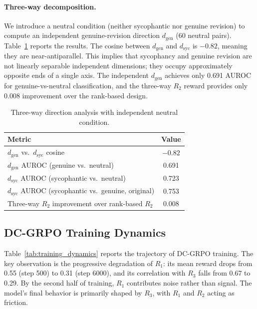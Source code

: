 \documentclass[11pt,a4paper]{article}
\begin{document}
\paragraph{Three-way decomposition.}
We introduce a neutral condition (neither sycophantic nor genuine revision) to compute an independent genuine-revision direction $d_{\mathrm{gen}}$ (60 neutral pairs). Table~\ref{tab:threeway} reports the results. The cosine between $d_{\mathrm{gen}}$ and $d_{\mathrm{syc}}$ is $-0.82$, meaning they are near-antiparallel. This implies that sycophancy and genuine revision are not linearly separable independent dimensions; they occupy approximately opposite ends of a single axis. The independent $d_{\mathrm{gen}}$ achieves only 0.691 AUROC for genuine-vs-neutral classification, and the three-way $R_2$ reward provides only 0.008 improvement over the rank-based design.

\begin{table}[h]
\centering
\caption{Three-way direction analysis with independent neutral condition.}
\label{tab:threeway}
\small
\begin{tabular}{lc}
\toprule
Metric & Value \\
\midrule
$d_{\mathrm{gen}}$ vs.\ $d_{\mathrm{syc}}$ cosine & $-0.82$ \\
$d_{\mathrm{gen}}$ AUROC (genuine vs.\ neutral) & 0.691 \\
$d_{\mathrm{syc}}$ AUROC (sycophantic vs.\ neutral) & 0.723 \\
$d_{\mathrm{syc}}$ AUROC (sycophantic vs.\ genuine, original) & 0.753 \\
Three-way $R_2$ improvement over rank-based $R_2$ & 0.008 \\
\bottomrule
\end{tabular}
\end{table}

\subsection{DC-GRPO Training Dynamics}
\label{sec:training}

Table~\ref{tab:training_dynamics} reports the trajectory of DC-GRPO training. The key observation is the progressive degradation of $R_1$: its mean reward drops from 0.55 (step 500) to 0.31 (step 6000), and its correlation with $R_3$ falls from 0.67 to 0.29. By the second half of training, $R_1$ contributes noise rather than signal. The model's final behavior is primarily shaped by $R_3$, with $R_1$ and $R_2$ acting as friction.
\end{document}
